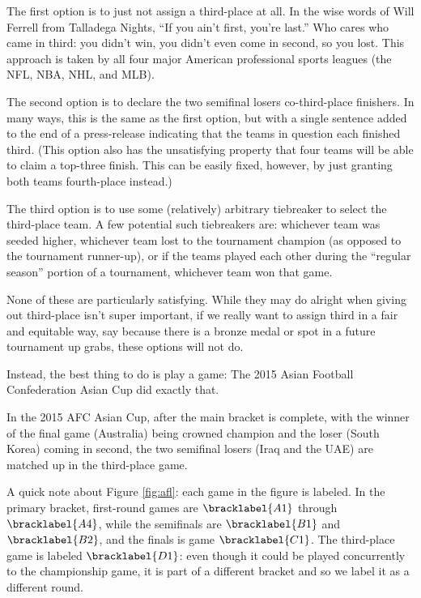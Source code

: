 {    The first option is to just not assign a third-place at all. In the wise words of Will Ferrell from Talladega Nights, ``If you ain't first, you're last.'' Who cares who came in third: you didn't win, you didn't even come in second, so you lost. This approach is taken by all four major American professional sports leagues (the NFL, NBA, NHL, and MLB).

    The second option is to declare the two semifinal losers co-third-place finishers. In many ways, this is the same as the first option, but with a single sentence added to the end of a press-release indicating that the teams in question each finished third. (This option also has the unsatisfying property that four teams will be able to claim a top-three finish. This can be easily fixed, however, by just granting both teams fourth-place instead.)

    The third option is to use some (relatively) arbitrary tiebreaker to select the third-place team. A few potential such tiebreakers are: whichever team was seeded higher, whichever team lost to the tournament champion (as opposed to the tournament runner-up), or if the teams played each other during the ``regular season'' portion of a tournament, whichever team won that game.

    None of these are particularly satisfying. While they may do alright when giving out third-place isn't super important, if we really want to assign third in a fair and equitable way, say because there is a bronze medal or spot in a future tournament up grabs, these options will not do.

    Instead, the best thing to do is play a game: The 2015 Asian Football Confederation Asian Cup did exactly that.


    In the 2015 AFC Asian Cup, after the main bracket is complete, with the winner of the final game (Australia) being crowned champion and the loser (South Korea) coming in second, the two semifinal losers (Iraq and the UAE) are matched up in the third-place game.

    A quick note about Figure \ref{fig:afl}: each game in the figure is labeled. In the primary bracket, first-round games are $\bracklabel{A1}$ through $\bracklabel{A4}$, while the semifinals are $\bracklabel{B1}$ and $\bracklabel{B2}$, and the finals is game $\bracklabel{C1}$. The third-place game is labeled $\bracklabel{D1}$: even though it could be played concurrently to the championship game, it is part of a different bracket and so we label it as a different round. %

}
